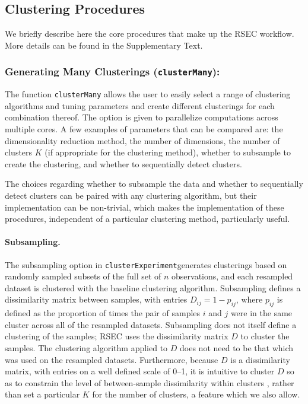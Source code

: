 \documentclass[10pt,letterpaper]{article}
\newcommand{\f}[1]{\texttt{#1}}
\newcommand{\CE}{\f{clusterExperiment}}
\begin{document}
\subsection{Clustering Procedures}
\label{sec:clustering}

We briefly describe here the core procedures that make up the RSEC workflow. More details can be found in the Supplementary Text.

\subsubsection{Generating Many Clusterings (\f{clusterMany}):}
\label{sec:clusterMany}

The function \f{clusterMany} allows the user to easily select a range of clustering algorithms and tuning parameters and create different clusterings for each combination thereof. The option is given to parallelize computations across multiple cores. A few examples of parameters that can be compared are: the dimensionality reduction method, the number of dimensions, the number of clusters $K$ (if appropriate for the clustering method), whether to subsample to create the clustering, and whether to sequentially detect clusters.  

The choices regarding whether to subsample the data and whether to sequentially detect clusters can be paired with any clustering algorithm, but their implementation can be non-trivial, which makes the implementation of these procedures, independent of a particular clustering method, particularly useful.  

\paragraph{Subsampling.}

The subsampling option in \CE generates clusterings based on randomly sampled subsets of the full set of $n$ observations, and each resampled dataset is clustered with the baseline clustering algorithm. Subsampling defines a dissimilarity matrix between samples, with entries $D_{ij}=1-p_{ij}$, where $p_{ij}$ is defined as the proportion of times the pair of samples $i$ and $j$ were in the same cluster across all of the resampled datasets. Subsampling does not itself define a clustering of the samples; RSEC uses the dissimilarity matrix $D$ to cluster the samples. The clustering algorithm applied to $D$ does not need to be that which was used on the resampled datasets. 
Furthermore, because $D$ is a dissimilarity matrix, with entries on a well defined scale of 0--1, it is intuitive to cluster $D$ so as to constrain the level of between-sample dissimilarity within clusters \cite{Tseng:2005ir}, rather than set a particular $K$ for the number of clusters, a feature which we also allow.
\end{document}
